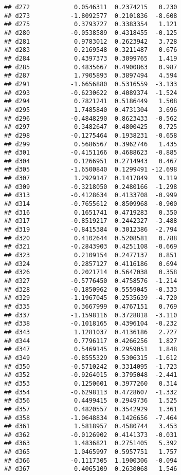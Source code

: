 \documentclass[
]{article}
\begin{document}
\begin{verbatim}
## d272            0.0546311  0.2374215   0.230
## d273           -1.8092577  0.2101836  -8.608
## d275            0.3793727  0.3383354   1.121
## d280           -0.0538589  0.4318455  -0.125
## d281            0.9783012  0.2623942   3.728
## d283            0.2169548  0.3211487   0.676
## d284            0.4397373  0.3099765   1.419
## d285            0.4835667  0.4900863   0.987
## d287            1.7905893  0.3897494   4.594
## d291           -1.6656880  0.5316559  -3.133
## d293           -0.6230622  0.4089374  -1.524
## d294            0.7821241  0.5186449   1.508
## d295            1.7485840  0.4731304   3.696
## d296           -0.4848290  0.8623433  -0.562
## d297            0.3482647  0.4800425   0.725
## d298           -0.1275464  0.1938231  -0.658
## d299            0.5686567  0.3962746   1.435
## d301           -0.4151166  0.4688623  -0.885
## d304            0.1266951  0.2714943   0.467
## d305           -1.6500840  0.1299491 -12.698
## d307            1.2929147  0.1417849   9.119
## d309           -0.3218050  0.2480166  -1.298
## d313           -0.4128634  0.4133708  -0.999
## d314           -0.7655612  0.8509968  -0.900
## d316            0.1651741  0.4719283   0.350
## d317           -0.8519217  0.2442327  -3.488
## d319           -0.8415384  0.3012386  -2.794
## d320            0.4102644  0.5208581   0.788
## d321           -0.2843903  0.4251108  -0.669
## d323            0.2109154  0.2477137   0.851
## d324            0.2857127  0.4116186   0.694
## d326            0.2021714  0.5647038   0.358
## d327           -0.5776450  0.4758576  -1.214
## d328           -0.1850962  0.5559045  -0.333
## d329           -1.1967045  0.2535639  -4.720
## d335            0.3667999  0.4767151   0.769
## d337           -1.1598116  0.3728818  -3.110
## d338           -0.1018165  0.4396104  -0.232
## d343            1.1281037  0.4136186   2.727
## d344            0.7796117  0.4266256   1.827
## d347            0.5469145  0.2959051   1.848
## d349           -0.8555329  0.5306315  -1.612
## d350           -0.5710242  0.3314095  -1.723
## d352           -0.9264015  0.3795048  -2.441
## d353            0.1250601  0.3977260   0.314
## d354           -0.6298113  0.4728607  -1.332
## d356            0.4499415  0.2949736   1.525
## d357            0.4820557  0.3542929   1.361
## d358           -1.0648834  0.1426656  -7.464
## d361            1.5818957  0.4580744   3.453
## d362           -0.0126902  0.4141373  -0.031
## d363            1.4836821  0.2751405   5.392
## d365            1.0465997  0.5957751   1.757
## d366           -0.1117305  1.1900306  -0.094
## d367            0.4065109  0.2630068   1.546

\end{verbatim}
\end{document}
